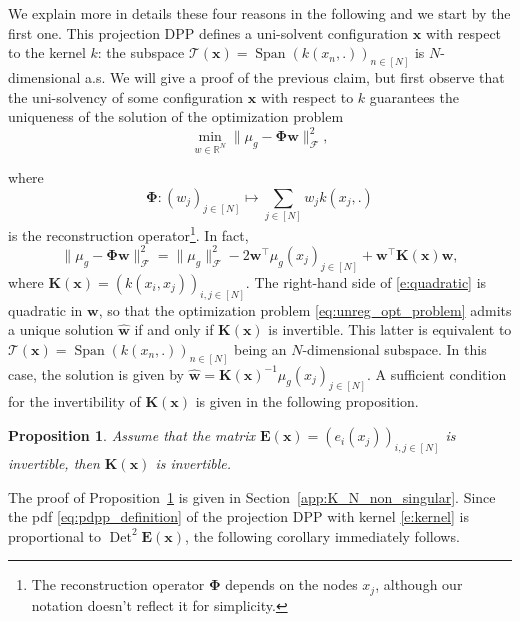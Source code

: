 \documentclass[twoside,11pt]{book}
\newtheorem{proposition}{Proposition}
\DeclareMathOperator{\Det}{Det}
\DeclareMathOperator{\Span}{\mathrm{Span}}
\DeclareMathOperator{\Tran}{\intercal}
\begin{document}
We explain more in details these four reasons in the following and we start by the first one. This projection DPP defines a uni-solvent configuration $\bm{x}$ with respect to the kernel $k$: the subspace $\mathcal{T}(\bm{x}) = \Span (k(x_{n},.))_{n \in [N]}$ is $N$-dimensional a.s. We will give a proof of the previous claim, but first observe that the uni-solvency of some configuration $\bm{x}$ with respect to $k$ guarantees the uniqueness of the solution of the optimization problem 
\begin{equation}\label{eq:unreg_opt_problem}
\min\limits_{w \in \mathbb{R}^{N}} \| \mu_{g} - \bm{\Phi} \bm{w} \|_{\mathcal{F}}^{2},
\end{equation}

where
\begin{equation}
	\bm{\Phi}:(w_{j})_{j \in [N]} \mapsto \sum_{j \in [N]} w_{j} k(x_{j},.)
\end{equation}
 is the reconstruction operator\footnote{The reconstruction operator $\bm{\Phi}$ depends on the nodes $x_{j}$, although our notation doesn't reflect it for simplicity.}.
 In fact, \begin{equation}
\| \mu_{g} - \bm{\Phi} \bm{w} \|_{\mathcal{F}}^{2} = \|\mu_{g}\|_{\mathcal{F}}^{2} - 2 \bm{w}^{\Tran} \mu_{g}(x_{j})_{j \in [N]} + \bm{w}^{\Tran} \bm{K}(\bm{x}) \bm{w},
\label{e:quadratic}
\end{equation}
where $\bm{K}(\bm{x}) = (k(x_{i},x_{j}))_{i,j \in [N]}$. The right-hand side of \eqref{e:quadratic} is quadratic in $\bm{w}$, so that the optimization problem \eqref{eq:unreg_opt_problem}
admits a unique solution $\hat{\bm{w}}$ if and only if $\bm{K}(\bm{x})$ is invertible. This latter is equivalent to $\mathcal{T}(\bm{x}) = \Span (k(x_{n},.))_{n \in [N]}$ being an $N$-dimensional subspace. In this case, the solution is given by $\hat{\bm{w}} = \bm{K}(\bm{x})^{-1}\mu_{g}(x_{j})_{j \in [N]}$. A sufficient condition for the invertibility of $\bm{K}(\bm{x})$ is given in the following proposition.
\begin{proposition}\label{prop:K_N_non_singular}
Assume that the matrix
$\bm{E}(\bm{x}) = (e_{i}(x_{j}))_{ i,j \in [N]}$ is invertible, then $\bm{K}(\bm{x})$ is invertible.
\end{proposition}
The proof of Proposition~\ref{prop:K_N_non_singular} is given in Section~\ref{app:K_N_non_singular}.
Since the pdf \eqref{eq:pdpp_definition} of the projection DPP with kernel \eqref{e:kernel} is proportional to $\Det^2\bm{E}(\bm{x})$, the following corollary immediately follows.
\end{document}
